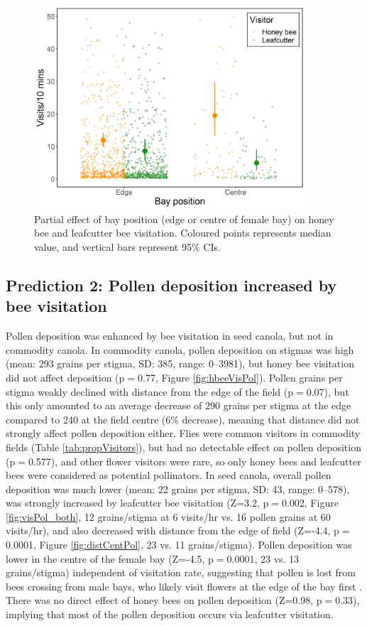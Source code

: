 \documentclass[12pt]{article} %
\begin{document}
\begin{figure}
    \centering
    \includegraphics[width=0.9\textwidth,keepaspectratio=true]{slopeEdgeCent_both.png}
    \caption[Partial effect of bay position on honey bee and leafcutter bee visitation]{Partial effect of bay position (edge or centre of female bay) on honey bee and leafcutter bee visitation. Coloured points represents median value, and vertical bars represent 95\% CIs.}
    \label{fig:edgeCentVis_both}
\end{figure}


\subsection{Prediction 2: Pollen deposition increased by bee visitation}
Pollen deposition was enhanced by bee visitation in seed canola, but not in commodity canola.
In commodity canola, pollen deposition on stigmas was high (mean: 293 grains per stigma, SD: 385, range: 0--3981), but honey bee visitation did not affect deposition (p$=$0.77, Figure \ref{fig:hbeeVisPol}).
Pollen grains per stigma weakly declined with distance from the edge of the field (p$=$0.07), but this only amounted to an average decrease of 290 grains per stigma at the edge compared to 240 at the field centre (6\% decrease), meaning that distance did not strongly affect pollen deposition either.
Flies were common visitors in commodity fields (Table \ref{tab:propVisitors}), but had no detectable effect on pollen deposition (p$=$0.577), and other flower visitors were rare, so only honey bees and leafcutter bees were considered as potential pollinators.
In seed canola, overall pollen deposition was much lower (mean: 22 grains per stigma, SD: 43, range: 0--578), was strongly increased by leafcutter bee visitation (Z=3.2, p$=$0.002, Figure \ref{fig:visPol_both}, 12 grains/stigma at 6 visits/hr vs. 16 pollen grains at 60 visits/hr), and also decreased with distance from the edge of field (Z=-4.4, p$=$0.0001, Figure \ref{fig:distCentPol}, 23 vs. 11 grains/stigma).
Pollen deposition was lower in the centre of the female bay (Z=-4.5, p$=$0.0001, 23 vs. 13 grains/stigma) independent of visitation rate, suggesting that pollen is lost from bees crossing from male bays, who likely visit flowers at the edge of the bay first \citep{pinnisch1990}. 
There was no direct effect of honey bees on pollen deposition (Z=0.98, p$=$0.33), implying that most of the pollen deposition occurs via leafcutter visitation. 
\end{document}
